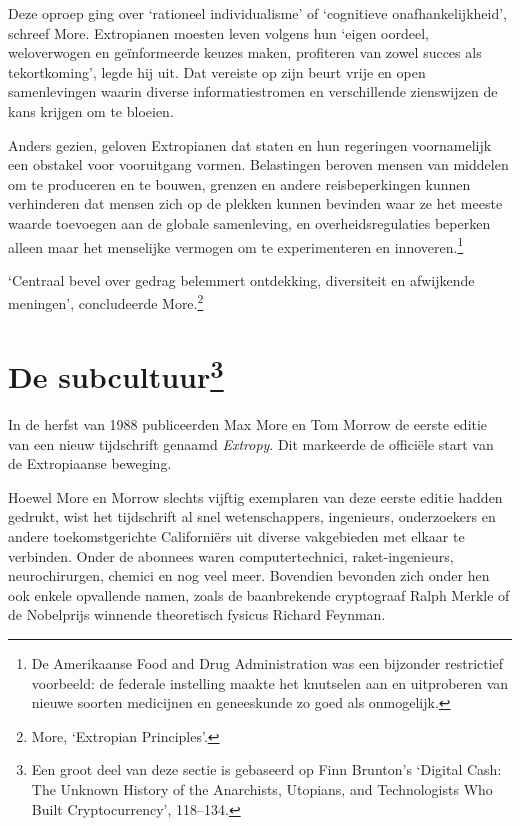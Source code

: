 \documentclass[smalldemyvopaper,11pt,twoside,onecolumn,openright,extrafontsizes,hidelinks]{memoir}
\begin{document}
Deze oproep ging over `rationeel individualisme' of `cognitieve
onafhankelijkheid', schreef More. Extropianen moesten leven volgens hun
`eigen oordeel, weloverwogen en geïnformeerde keuzes maken, profiteren
van zowel succes als tekortkoming', legde hij uit. Dat vereiste op zijn
beurt vrije en open samenlevingen waarin diverse informatiestromen en
verschillende zienswijzen de kans krijgen om te bloeien.

Anders gezien, geloven Extropianen dat staten en hun regeringen
voornamelijk een obstakel voor vooruitgang vormen. Belastingen beroven
mensen van middelen om te produceren en te bouwen, grenzen en andere
reisbeperkingen kunnen verhinderen dat mensen zich op de plekken kunnen
bevinden waar ze het meeste waarde toevoegen aan de globale samenleving,
en overheidsregulaties beperken alleen maar het menselijke vermogen om
te experimenteren en innoveren.\footnote{De Amerikaanse Food and Drug
  Administration was een bijzonder restrictief voorbeeld: de federale
  instelling maakte het knutselen aan en uitproberen van nieuwe soorten
  medicijnen en geneeskunde zo goed als onmogelijk.}

`Centraal bevel over gedrag belemmert ontdekking, diversiteit en
afwijkende meningen', concludeerde More.\footnote{More, `Extropian
  Principles'.}

\section[De subcultuur]{\texorpdfstring{De
subcultuur\footnote{Een groot deel van deze sectie is gebaseerd op Finn
  Brunton's `Digital Cash: The Unknown History of the Anarchists,
  Utopians, and Technologists Who Built Cryptocurrency', 118--134.}}{De subcultuur}}\label{de-subcultuur131}

In de herfst van 1988 publiceerden Max More en Tom Morrow de eerste
editie van een nieuw tijdschrift genaamd \emph{Extropy}. Dit markeerde
de officiële start van de Extropiaanse beweging.

Hoewel More en Morrow slechts vijftig exemplaren van deze eerste editie
hadden gedrukt, wist het tijdschrift al snel wetenschappers, ingenieurs,
onderzoekers en andere toekomstgerichte Californiërs uit diverse
vakgebieden met elkaar te verbinden. Onder de abonnees waren
computertechnici, raket-ingenieurs, neurochirurgen, chemici en nog veel
meer. Bovendien bevonden zich onder hen ook enkele opvallende namen,
zoals de baanbrekende cryptograaf Ralph Merkle of de Nobelprijs winnende
theoretisch fysicus Richard Feynman.
\end{document}
